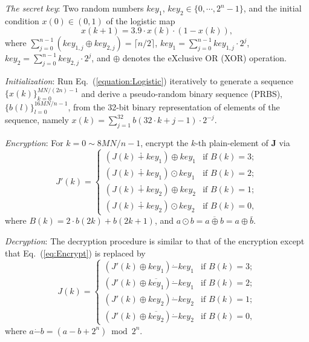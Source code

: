 \documentclass{ws-ijbc}
\begin{document}
\begin{itemlist}
\item \textit{The secret key}: Two random numbers $key_1$, $key_2\in\{0, \cdots, 2^n-1\}$, and the initial condition $x(0)\in(0,1)$
of the logistic map
\begin{equation}
x(k+1)=3.9\cdot x(k)\cdot(1-x(k)),\label{equation:Logistic}
\end{equation}
where $\sum_{j=0}^{n-1}(key_{1,j}\oplus key_{2,j})=\lceil n/2\rceil$, $key_1=\sum_{j=0}^{n-1}key_{1,j}\cdot 2^j$, $key_2=\sum_{j=0}^{n-1}key_{2,j}\cdot 2^j$, and
$\oplus$ denotes the eXclusive OR (XOR) operation.

\item \textit{Initialization}: Run Eq.~(\ref{equation:Logistic}) iteratively to generate a sequence $\{x(k)\}_{k=0}^{MN/(2n)-1}$ and
derive a pseudo-random binary sequence (PRBS), $\{b(l)\}_{l=0}^{16MN/n-1}$, from the 32-bit binary representation of elements of
the sequence, namely $x(k)=\sum_{j=1}^{32}b(32\cdot k+j-1)\cdot 2^{-j}$.

\item \textit{Encryption}: For $k=0\sim 8MN/n-1$, encrypt the $k$-th plain-element of $\bm{J}$ via
\begin{equation}
J'(k)=
\begin{cases}
(J(k)\dotplus key_1)\oplus key_1 & \mbox{if }B(k)=3;\\
(J(k)\dotplus key_1)\odot  key_1 & \mbox{if }B(k)=2;\\
(J(k)\dotplus key_2)\oplus key_2 & \mbox{if }B(k)=1;\\
(J(k)\dotplus key_2)\odot  key_2 & \mbox{if }B(k)=0,
\end{cases}
\label{eq:Encrypt}
\end{equation}
where $B(k)=2\cdot b(2k)+b(2k+1)$, and
$a\odot b=\overline{a\oplus b}=a\oplus\bar{b}$.

\item \textit{Decryption}: The decryption procedure is similar to that of the encryption except that Eq.~(\ref{eq:Encrypt}) is replaced by
\begin{equation}
J(k)=
\begin{cases}
(J'(k)\oplus key_1)\dot{-}key_1            & \mbox{if }B(k)=3;\\
(J'(k)\oplus \overline{key_1})\dot{-}key_1 & \mbox{if }B(k)=2;\\
(J'(k)\oplus key_2)\dot{-}key_2            & \mbox{if }B(k)=1;\\
(J'(k)\oplus \overline{key_2})\dot{-}key_2 & \mbox{if }B(k)=0,
\end{cases}
\label{eq:decrypt}
\end{equation}
where $a\dot{-} b=(a-b+2^n)\bmod 2^n$.
\end{itemlist}
\end{document}
